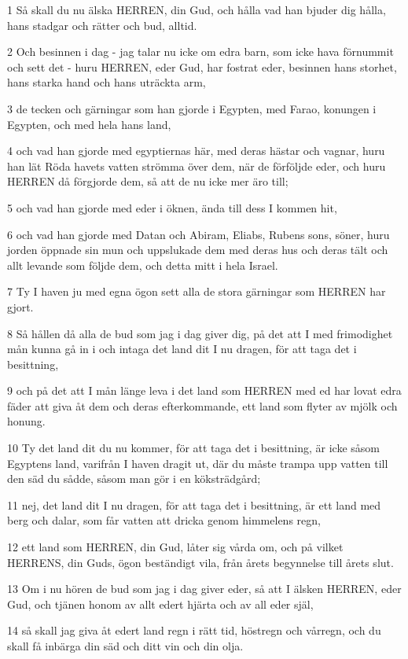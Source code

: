 \par 1 Så skall du nu älska HERREN, din Gud, och hålla vad han bjuder dig hålla, hans stadgar och rätter och bud, alltid.
\par 2 Och besinnen i dag - jag talar nu icke om edra barn, som icke hava förnummit och sett det - huru HERREN, eder Gud, har fostrat eder, besinnen hans storhet, hans starka hand och hans uträckta arm,
\par 3 de tecken och gärningar som han gjorde i Egypten, med Farao, konungen i Egypten, och med hela hans land,
\par 4 och vad han gjorde med egyptiernas här, med deras hästar och vagnar, huru han lät Röda havets vatten strömma över dem, när de förföljde eder, och huru HERREN då förgjorde dem, så att de nu icke mer äro till;
\par 5 och vad han gjorde med eder i öknen, ända till dess I kommen hit,
\par 6 och vad han gjorde med Datan och Abiram, Eliabs, Rubens sons, söner, huru jorden öppnade sin mun och uppslukade dem med deras hus och deras tält och allt levande som följde dem, och detta mitt i hela Israel.
\par 7 Ty I haven ju med egna ögon sett alla de stora gärningar som HERREN har gjort.
\par 8 Så hållen då alla de bud som jag i dag giver dig, på det att I med frimodighet mån kunna gå in i och intaga det land dit I nu dragen, för att taga det i besittning,
\par 9 och på det att I mån länge leva i det land som HERREN med ed har lovat edra fäder att giva åt dem och deras efterkommande, ett land som flyter av mjölk och honung.
\par 10 Ty det land dit du nu kommer, för att taga det i besittning, är icke såsom Egyptens land, varifrån I haven dragit ut, där du måste trampa upp vatten till den säd du sådde, såsom man gör i en köksträdgård;
\par 11 nej, det land dit I nu dragen, för att taga det i besittning, är ett land med berg och dalar, som får vatten att dricka genom himmelens regn,
\par 12 ett land som HERREN, din Gud, låter sig vårda om, och på vilket HERRENS, din Guds, ögon beständigt vila, från årets begynnelse till årets slut.
\par 13 Om i nu hören de bud som jag i dag giver eder, så att I älsken HERREN, eder Gud, och tjänen honom av allt edert hjärta och av all eder själ,
\par 14 så skall jag giva åt edert land regn i rätt tid, höstregn och vårregn, och du skall få inbärga din säd och ditt vin och din olja.
